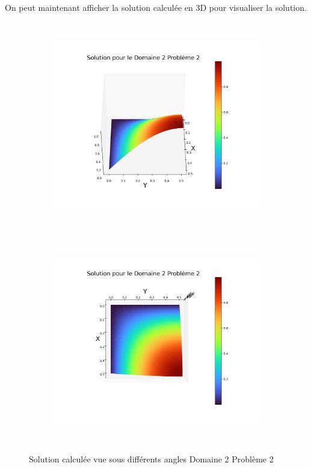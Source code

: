 \documentclass[a4paper, 12pt, french]{report}
\begin{document}
On peut maintenant afficher la solution calculée en 3D pour visualiser la solution.
\begin{figure}[!h]
    \centering
    \begin{subfigure}{0.48\textwidth}
    	\centering
        \includegraphics[height=9cm]{../Images/Figures_Calculees/sol3D22.png}
    \end{subfigure}
    \begin{subfigure}{0.48\textwidth}
    \centering
        \includegraphics[height=9cm]{../Images/Figures_Calculees/sol3DVH22.png}
    \end{subfigure}
    \caption{Solution calculée vue sous différents angles Domaine 2 Problème 2 }
\end{figure}
\newpage

\end{document}
